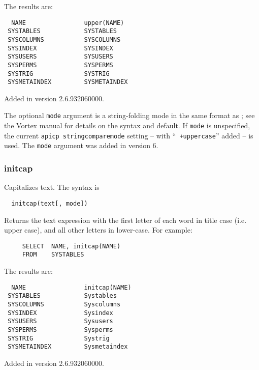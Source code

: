 The results are:

\begin{screen}
\begin{verbatim}
  NAME                upper(NAME)
 SYSTABLES            SYSTABLES
 SYSCOLUMNS           SYSCOLUMNS
 SYSINDEX             SYSINDEX
 SYSUSERS             SYSUSERS
 SYSPERMS             SYSPERMS
 SYSTRIG              SYSTRIG
 SYSMETAINDEX         SYSMETAINDEX
\end{verbatim}
\end{screen}

Added in version 2.6.932060000.

  The optional \verb`mode` argument is a string-folding mode in the
same format as {\tt <apicp stringcomparemode>}; see the Vortex manual
for details on the syntax and default.  If \verb`mode` is unspecified,
the current {\tt apicp stringcomparemode} setting -- with ``{\tt
+uppercase}'' added -- is used.  The \verb`mode` argument was added in
version 6.

\subsubsection{initcap}

Capitalizes text.  The syntax is
\begin{verbatim}
  initcap(text[, mode])
\end{verbatim}

Returns the text expression with the first letter of each word in
title case (i.e. upper case), and all other letters in lower-case.
For example:

\begin{verbatim}
     SELECT  NAME, initcap(NAME)
     FROM    SYSTABLES
\end{verbatim}

The results are:

\begin{screen}
\begin{verbatim}
  NAME                initcap(NAME)
 SYSTABLES            Systables
 SYSCOLUMNS           Syscolumns
 SYSINDEX             Sysindex
 SYSUSERS             Sysusers
 SYSPERMS             Sysperms
 SYSTRIG              Systrig
 SYSMETAINDEX         Sysmetaindex
\end{verbatim}
\end{screen}

Added in version 2.6.932060000.

